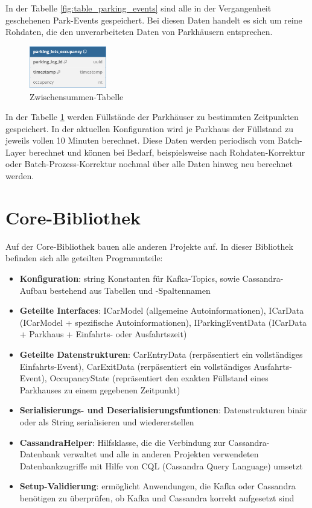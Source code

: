 In der Tabelle \ref{fig:table_parking_events} sind alle in der Vergangenheit geschehenen Park-Events gespeichert.
Bei diesen Daten handelt es sich um reine Rohdaten, die den unverarbeiteten Daten von Parkhäusern entsprechen.

\begin{figure}[h!]%
    \centering%
    \includegraphics[width=0.3\textwidth]{Graphics/occupancy.png}%
    \caption{Zwischensummen-Tabelle}%
    \label{fig:table_occupancy}
\end{figure}%

In der Tabelle \ref{fig:table_occupancy} werden Füllstände der Parkhäuser zu bestimmten Zeitpunkten gespeichert.
In der aktuellen Konfiguration wird je Parkhaus der Füllstand zu jeweils vollen 10 Minuten berechnet.
Diese Daten werden periodisch vom Batch-Layer berechnet und können bei Bedarf, beispielsweise nach Rohdaten-Korrektur oder Batch-Prozess-Korrektur nochmal über alle Daten hinweg neu berechnet werden.

\section{Core-Bibliothek}
Auf der Core-Bibliothek bauen alle anderen Projekte auf.
In dieser Bibliothek befinden sich alle geteilten Programmteile:
\begin{itemize}
    \item \textbf{Konfiguration}: string Konstanten für Kafka-Topics, sowie Cassandra-Aufbau bestehend aus Tabellen und -Spaltennamen
    \item \textbf{Geteilte Interfaces}: ICarModel (allgemeine Autoinformationen), ICarData (ICarModel + spezifische Autoinformationen), IParkingEventData (ICarData + Parkhaus + Einfahrts- oder Ausfahrtszeit)
    \item \textbf{Geteilte Datenstrukturen}: CarEntryData (rerpäsentiert ein vollständiges Einfahrts-Event), CarExitData (rerpäsentiert ein vollständiges Ausfahrts-Event), OccupancyState (repräsentiert den exakten Füllstand eines Parkhauses zu einem gegebenen Zeitpunkt)
    \item \textbf{Serialisierungs- und Deserialisierungsfuntionen}: Datenstrukturen binär oder als String serialisieren und wiedererstellen
    \item \textbf{CassandraHelper}: Hilfsklasse, die die Verbindung zur Cassandra-Datenbank verwaltet und alle in anderen Projekten verwendeten Datenbankzugriffe mit Hilfe von CQL (Cassandra Query Language) umsetzt
    \item \textbf{Setup-Validierung}: ermöglicht Anwendungen, die Kafka oder Cassandra benötigen zu überprüfen, ob Kafka und Cassandra korrekt aufgesetzt sind
\end{itemize}


